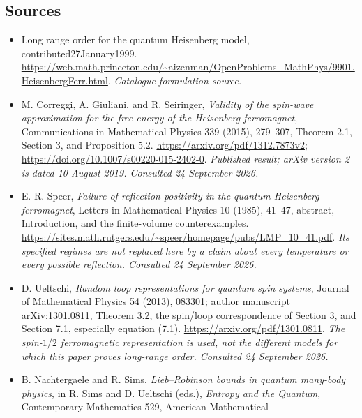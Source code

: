 \documentclass[11pt]{article}
\begin{document}
\subsection{Sources}
\begin{itemize}\raggedright
		\item[\textnormal{[S1]}]\hypertarget{source:30006979:1}{} Long range order for the quantum Heisenberg model, contributed27January1999.
		\url{https://web.math.princeton.edu/~aizenman/OpenProblems_MathPhys/9901.HeisenbergFerr.html}.
		{\small\textit{Catalogue formulation source.}}
		\item[\textnormal{[E1]}]\hypertarget{extra:30006979:1}{}
		M. Correggi, A. Giuliani, and R. Seiringer, \emph{Validity of the
			spin-wave approximation for the free energy of the Heisenberg
			ferromagnet}, Communications in Mathematical Physics 339 (2015),
		279--307, Theorem 2.1, Section 3, and Proposition 5.2.
		\url{https://arxiv.org/pdf/1312.7873v2};
		\url{https://doi.org/10.1007/s00220-015-2402-0}.
		{\small\textit{Published result; arXiv version 2 is dated 10 August 2019.
				Consulted 24 September 2026.}}
		\item[\textnormal{[E2]}]\hypertarget{extra:30006979:2}{}
		E. R. Speer, \emph{Failure of reflection positivity in the quantum
			Heisenberg ferromagnet}, Letters in Mathematical Physics 10 (1985),
		41--47, abstract, Introduction, and the finite-volume counterexamples.
		\url{https://sites.math.rutgers.edu/~speer/homepage/pubs/LMP_10_41.pdf}.
		{\small\textit{Its specified regimes are not replaced here by a claim
				about every temperature or every possible reflection. Consulted
				24 September 2026.}}
		\item[\textnormal{[E3]}]\hypertarget{extra:30006979:3}{}
		D. Ueltschi, \emph{Random loop representations for quantum spin systems},
		Journal of Mathematical Physics 54 (2013), 083301; author manuscript
		arXiv:1301.0811, Theorem 3.2, the spin/loop correspondence of Section 3,
		and Section 7.1, especially equation (7.1).
		\url{https://arxiv.org/pdf/1301.0811}.
		{\small\textit{The spin-$1/2$ ferromagnetic representation is used, not
				the different models for which this paper proves long-range order.
				Consulted 24 September 2026.}}
		\item[\textnormal{[E4]}]\hypertarget{extra:30006979:4}{}
		B. Nachtergaele and R. Sims, \emph{Lieb--Robinson bounds in quantum
			many-body physics}, in R. Sims and D. Ueltschi (eds.), \emph{Entropy
			and the Quantum}, Contemporary Mathematics 529, American Mathematical

\end{itemize}
\end{document}
